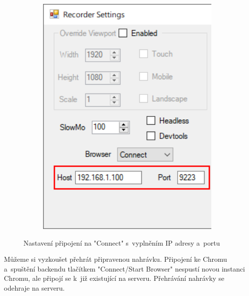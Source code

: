 \documentclass[12pt, a4paper, twoside]{article}
\begin{document}
\begin{figure}[H]
\begin{minipage}{0.45\textwidth}
\begin{subfigure}[t]{1.0\textwidth}
				\includegraphics[width=1.0\textwidth, right]{browserConnectFilled.png}
			\end{subfigure}	
		\end{minipage}
		\caption{Nastavení připojení na "Connect" s~vyplněním IP adresy a~portu}
	\end{figure}
	Můžeme si vyzkoušet přehrát připravenou nahrávku. Připojení ke Chromu a~spuštění backendu tlačítkem "Connect/Start Browser" nespustí novou instanci Chromu, ale připojí se k~již existující na serveru. Přehrávání nahrávky se odehraje na serveru.
\end{document}
